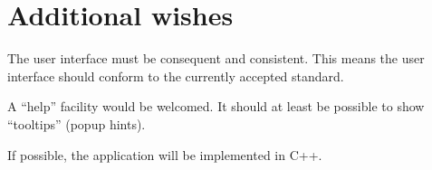 \section{Additional wishes}
\label{sect:demands:wishes}
The user interface must be consequent and consistent. This means the user
interface should conform to the currently accepted standard.

A ``help'' facility would be welcomed. It should at least be possible to show
``tooltips'' (popup hints).

\bigskip \noindent
If possible, the application will be implemented in C++.
